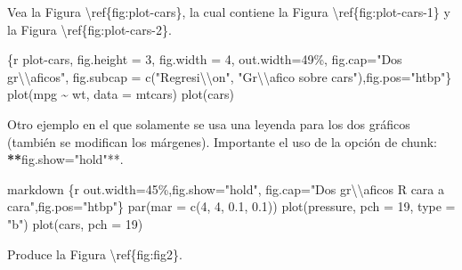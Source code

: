 \documentclass[11pt,a4paper,oneside,]{article}
\newenvironment{Shaded}{\begin{snugshade}}{\end{snugshade}}
\newcommand{\AttributeTok}[1]{\textcolor[rgb]{0.77,0.63,0.00}{#1}}
\newcommand{\DecValTok}[1]{\textcolor[rgb]{0.00,0.00,0.81}{#1}}
\newcommand{\ErrorTok}[1]{\textcolor[rgb]{0.64,0.00,0.00}{\textbf{#1}}}
\newcommand{\NormalTok}[1]{#1}
\newcommand{\SpecialCharTok}[1]{\textcolor[rgb]{0.00,0.00,0.00}{#1}}
\newcommand{\StringTok}[1]{\textcolor[rgb]{0.31,0.60,0.02}{#1}}
\numberwithin{dummy}{section}
\theoremstyle{ocrenumbox}
\theoremstyle{blacknumex}
\theoremstyle{blacknumbox}
\theoremstyle{ocrenum}
\theoremstyle{ocrenum}
\begin{document}
\begin{Shaded}
\begin{Highlighting}[numbers=left,,]
\StringTok{\textasciigrave{}\textasciigrave{}\textasciigrave{}\textasciigrave{}}



\NormalTok{Vea la Figura \textbackslash{}ref\{fig}\SpecialCharTok{:}\NormalTok{plot}\SpecialCharTok{{-}}\NormalTok{cars\}, la cual contiene la Figura }
\NormalTok{\textbackslash{}ref\{fig}\SpecialCharTok{:}\NormalTok{plot}\SpecialCharTok{{-}}\NormalTok{cars}\DecValTok{{-}1}\NormalTok{\} y la Figura \textbackslash{}ref\{fig}\SpecialCharTok{:}\NormalTok{plot}\SpecialCharTok{{-}}\NormalTok{cars}\DecValTok{{-}2}\NormalTok{\}.}

\StringTok{\textasciigrave{}\textasciigrave{}\textasciigrave{}}\AttributeTok{\{r plot{-}cars, fig.height = 3, fig.width = 4, out.width=\textquotesingle{}49\%\textquotesingle{}, fig.cap="Dos gr}\SpecialCharTok{\textbackslash{}\textbackslash{}}\AttributeTok{\textquotesingle{}aficos", fig.subcap = c("Regresi}\SpecialCharTok{\textbackslash{}\textbackslash{}}\AttributeTok{\textquotesingle{}on", "Gr}\SpecialCharTok{\textbackslash{}\textbackslash{}}\AttributeTok{\textquotesingle{}afico sobre cars"),fig.pos="htbp"\}}
\AttributeTok{plot(mpg \textasciitilde{} wt, data = mtcars)}
\AttributeTok{plot(cars)}
\StringTok{\textasciigrave{}\textasciigrave{}\textasciigrave{}}





\NormalTok{Otro ejemplo en el que solamente se usa una leyenda para los dos gráficos (también se modifican los márgenes). Importante el uso de la opción de chunk}\SpecialCharTok{:} \ErrorTok{**}\AttributeTok{fig.show=}\StringTok{"hold"}\SpecialCharTok{**}\NormalTok{.}

\StringTok{\textasciigrave{}\textasciigrave{}\textasciigrave{}\textasciigrave{}}\NormalTok{markdown}
\StringTok{\textasciigrave{}\textasciigrave{}\textasciigrave{}}\AttributeTok{\{r out.width=\textquotesingle{}45\%\textquotesingle{},fig.show="hold",}
\AttributeTok{        fig.cap="Dos gr}\SpecialCharTok{\textbackslash{}\textbackslash{}}\AttributeTok{\textquotesingle{}aficos R cara a cara",fig.pos="htbp"\}}
\AttributeTok{par(mar = c(4, 4, 0.1, 0.1))}
\AttributeTok{plot(pressure, pch = 19, type = "b")}
\AttributeTok{plot(cars, pch = 19)}
\StringTok{\textasciigrave{}\textasciigrave{}\textasciigrave{}}

\StringTok{\textasciigrave{}\textasciigrave{}\textasciigrave{}\textasciigrave{}}

\NormalTok{Produce la Figura \textbackslash{}ref\{fig}\SpecialCharTok{:}\NormalTok{fig2\}.}


\end{Highlighting}
\end{Shaded}
\end{document}
